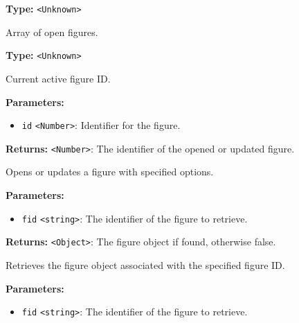 \documentclass[12pt,a4paper]{article}
\begin{document}
\noindent \textbf{Type:} \texttt{<Unknown>}

\noindent Array of open figures.

\vspace{5mm}
\noindent {}\vspace{4mm}


\noindent \textbf{Type:} \texttt{<Unknown>}

\noindent Current active figure ID.

\vspace{5mm}
\noindent {}


\noindent \textbf{Parameters:}
\begin{itemize}
  \item \texttt{id} \texttt{<Number>}: Identifier for the figure.
\end{itemize}

\noindent \textbf{Returns:} \texttt{<Number>}: The identifier of the opened or updated figure.

\noindent Opens or updates a figure with specified options.

\vspace{5mm}
\noindent {}


\noindent \textbf{Parameters:}
\begin{itemize}
  \item \texttt{fid} \texttt{<string>}: The identifier of the figure to retrieve.
\end{itemize}

\noindent \textbf{Returns:} \texttt{<Object>}: The figure object if found, otherwise \textasciigrave{}false\textasciigrave{}.

\noindent Retrieves the figure object associated with the specified figure ID.

\vspace{5mm}
\noindent {}


\noindent \textbf{Parameters:}
\begin{itemize}
  \item \texttt{fid} \texttt{<string>}: The identifier of the figure to retrieve.
\end{itemize}
\end{document}
